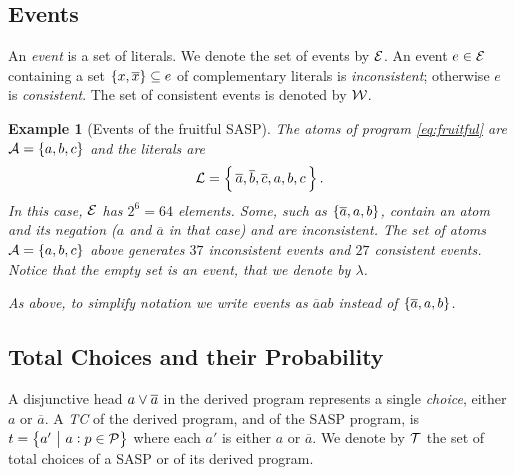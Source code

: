 \documentclass[a4paper]{article}
\newtheorem{example}{Example}
\newtheorem{example}{Example}
\newcommand{\cla}[1]{\ensuremath{{\cal #1}}}        %
\newcommand{\co}[1]{\ensuremath{\overline{#1}}}     %
\newcommand{\ATOMSset}{\ensuremath{\cla{A}}}
\newcommand{\LITERALSset}{\ensuremath{\cla{L}}}
\newcommand{\PROBFset}{\ensuremath{\cla{P}}}
\newcommand{\TCHOICEset}{\ensuremath{\cla{T}}}
\newcommand{\EVENTSset}{\ensuremath{\cla{E}}}
\newcommand{\CONSISTset}{\ensuremath{\cla{W}}}
\newcommand{\given}{\ensuremath{~\middle|~}}
\newcommand{\probfact}[2]{\ensuremath{#1:#2}}
\newcommand{\emptyevent}{\ensuremath{\lambda}}
\begin{document}
\subsection*{Events}

An \emph{event} is a set of literals.
We denote the set of events by \(\EVENTSset\).
An event \(e \in \EVENTSset\) containing a set
   \(\set{x, \co{x}} \subseteq e\)
of complementary literals is \textit{inconsistent};
otherwise \(e\) is \textit{consistent}.
The set of consistent events is denoted by \(\CONSISTset\).

\begin{example}[Events of the fruitful \ac{SASP}]\label{ex:events}\em
  The atoms of program \cref{eq:fruitful} are
  \(\ATOMSset = \set{a, b, c}\) and the literals are
\begin{equation*}
   \LITERALSset = \set{\, \co{a}, \co{b}, \co{c}, a, b, c\, }.
\end{equation*}
In this case, \(\EVENTSset\) has \(2^6 = 64\) elements.  Some, such as
\(\set{\co{a}, a, b}\), contain an atom and its negation (\(a\) and
\(\co{a}\) in that case) and are inconsistent.  The set of atoms
\(\ATOMSset = \set{a, b, c}\) above generates \(37\) inconsistent
events and \(27\) consistent events.  Notice that the empty set is an
event, that we denote by \emptyevent.
    
As above, to simplify notation we write events as \(\co{a}ab\) instead
of \(\set{\co{a}, a, b}\).
\end{example}


\subsection*{Total Choices and their Probability}

A disjunctive head \(a \disj \co{a}\) in the derived program
represents a single \textit{choice}, either \(a\) or \(\co{a}\).  A
\textit{\acl{TC}} of the derived program, and of the \ac{SASP}
program, is \(t = \set{a' \given \probfact{a}{p} \in \PROBFset}\)
where each \(a'\) is either \(a\) or \(\co{a}\).  We denote by
\(\TCHOICEset\) the set of total choices of a \ac{SASP} or of its
derived program.
\end{document}
